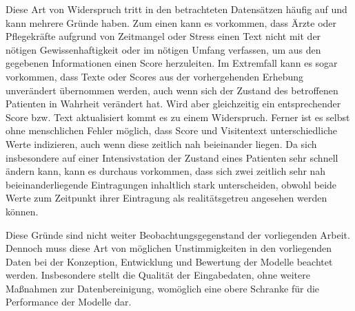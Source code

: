 Diese Art von Widerspruch tritt in den betrachteten Datensätzen häufig auf und kann mehrere Gründe haben. Zum einen kann es vorkommen, dass Ärzte oder Pflegekräfte aufgrund von Zeitmangel oder Stress einen Text nicht mit der nötigen Gewissenhaftigkeit oder im nötigen Umfang verfassen, um aus den gegebenen Informationen einen Score herzuleiten. Im Extremfall kann es sogar vorkommen, dass Texte oder Scores aus der vorhergehenden Erhebung unverändert übernommen werden, auch wenn sich der Zustand des betroffenen Patienten in Wahrheit verändert hat. Wird aber gleichzeitig ein entsprechender Score bzw. Text aktualisiert kommt es zu einem Widerspruch. Ferner ist es selbst ohne menschlichen Fehler möglich, dass Score und Visitentext unterschiedliche Werte indizieren, auch wenn diese zeitlich nah beieinander liegen. Da sich insbesondere auf einer Intensivstation der Zustand eines Patienten sehr schnell ändern kann, kann es durchaus vorkommen, dass sich zwei zeitlich sehr nah beieinanderliegende Eintragungen inhaltlich stark unterscheiden, obwohl beide Werte zum Zeitpunkt ihrer Eintragung als realitätsgetreu angesehen werden können.

Diese Gründe sind nicht weiter Beobachtungsgegenstand der vorliegenden Arbeit. Dennoch muss diese Art von möglichen Unstimmigkeiten in den vorliegenden Daten bei der Konzeption, Entwicklung und Bewertung der Modelle beachtet werden. Insbesondere stellt die Qualität der Eingabedaten, ohne weitere Maßnahmen zur Datenbereinigung, womöglich eine obere Schranke für die Performance der Modelle dar.